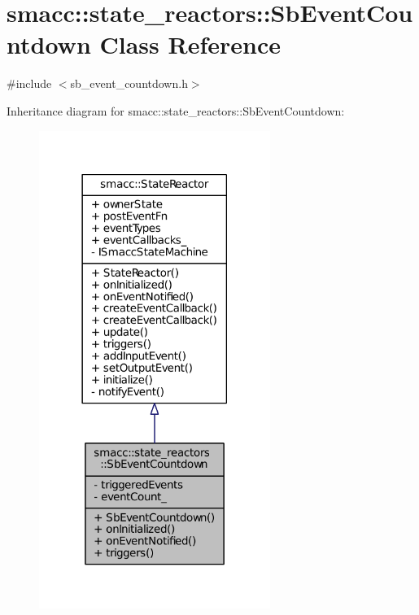 \hypertarget{classsmacc_1_1state__reactors_1_1SbEventCountdown}{}\section{smacc\+:\+:state\+\_\+reactors\+:\+:Sb\+Event\+Countdown Class Reference}
\label{classsmacc_1_1state__reactors_1_1SbEventCountdown}


{\ttfamily \#include $<$sb\+\_\+event\+\_\+countdown.\+h$>$}



Inheritance diagram for smacc\+:\+:state\+\_\+reactors\+:\+:Sb\+Event\+Countdown\+:
\nopagebreak
\begin{figure}[H]
\begin{center}
\leavevmode
\includegraphics[width=213pt]{classsmacc_1_1state__reactors_1_1SbEventCountdown__inherit__graph}
\end{center}
\end{figure}


